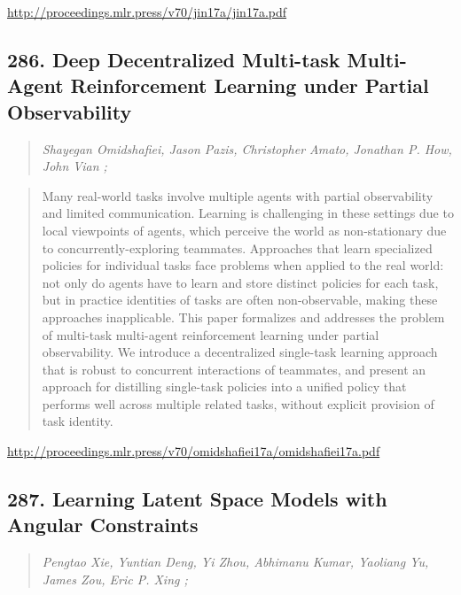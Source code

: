 \documentclass{article}
\begin{document}
\href{http://proceedings.mlr.press/v70/jin17a/jin17a.pdf}{http://proceedings.mlr.press/v70/jin17a/jin17a.pdf}

\subsection{286. Deep Decentralized Multi-task Multi-Agent Reinforcement Learning under Partial Observability}

\begin{quote}
\footnotesize{\textit{Shayegan Omidshafiei, Jason Pazis, Christopher Amato, Jonathan P. How, John Vian ;}}

\end{quote}

\begin{quote}
    Many real-world tasks involve multiple agents with partial observability and limited communication. Learning is challenging in these settings due to local viewpoints of agents, which perceive the world as non-stationary due to concurrently-exploring teammates. Approaches that learn specialized policies for individual tasks face problems when applied to the real world: not only do agents have to learn and store distinct policies for each task, but in practice identities of tasks are often non-observable, making these approaches inapplicable. This paper formalizes and addresses the problem of multi-task multi-agent reinforcement learning under partial observability. We introduce a decentralized single-task learning approach that is robust to concurrent interactions of teammates, and present an approach for distilling single-task policies into a unified policy that performs well across multiple related tasks, without explicit provision of task identity.  
\end{quote}

\href{http://proceedings.mlr.press/v70/omidshafiei17a/omidshafiei17a.pdf}{http://proceedings.mlr.press/v70/omidshafiei17a/omidshafiei17a.pdf}

\subsection{287. Learning Latent Space Models with Angular Constraints}

\begin{quote}
\footnotesize{\textit{Pengtao Xie, Yuntian Deng, Yi Zhou, Abhimanu Kumar, Yaoliang Yu, James Zou, Eric P. Xing ;}}

\end{quote}
\end{document}
